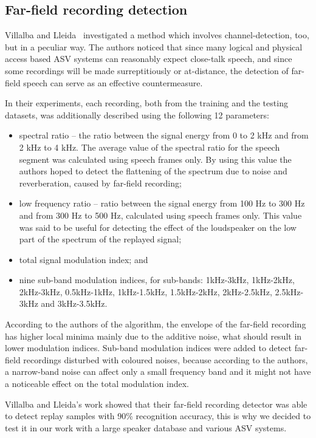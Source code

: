 \subsection{Far-field recording detection}

Villalba and Lleida~\cite{Villalba2011} investigated a method which involves  channel-detection, too, but in a peculiar way. The authors noticed that since many logical and physical access based ASV systems can reasonably expect close-talk speech, and since some recordings will be made surreptitiously or at-distance, the detection of far-field speech can serve as an effective countermeasure.  

In their experiments, each recording, both from the training and the testing datasets, was additionally described using the following 12 parameters:
\begin{itemize}
\item spectral ratio -- the ratio between
the signal energy from 0 to 2 kHz and from 2 kHz to 4 kHz.  The average value of the spectral ratio for the speech segment was calculated using speech frames only. By using this value the authors hoped to detect the flattening of the spectrum due to noise and reverberation, caused by far-field recording;
\item low frequency ratio -- ratio between the signal energy from 100 Hz to 300 Hz and from 300 Hz to 500 Hz, calculated using speech frames only. This value was said to be useful for detecting the effect of the loudspeaker on the low part of the spectrum of the replayed signal;
\item total signal modulation index; and
\item nine sub-band modulation indices, for sub-bands: 1kHz-3kHz, 1kHz-2kHz,
2kHz-3kHz, 0.5kHz-1kHz, 1kHz-1.5kHz, 1.5kHz-2kHz, 2kHz-2.5kHz, 2.5kHz-3kHz and 3kHz-3.5kHz.
\end{itemize}

According to the authors of the algorithm, the envelope of the far-field recording has higher local minima mainly due to the additive noise, what should result in lower modulation indices. Sub-band modulation indices were added to detect far-field recordings disturbed with coloured noises, because according to the authors, a narrow-band noise can affect only a small frequency band and it might not have a noticeable effect on the total modulation index.  


Villalba and Lleida's work showed that their far-field recording detector was able to detect replay samples with 90\% recognition accuracy, this is why we decided to test it in our work with a large speaker database and various ASV systems.


